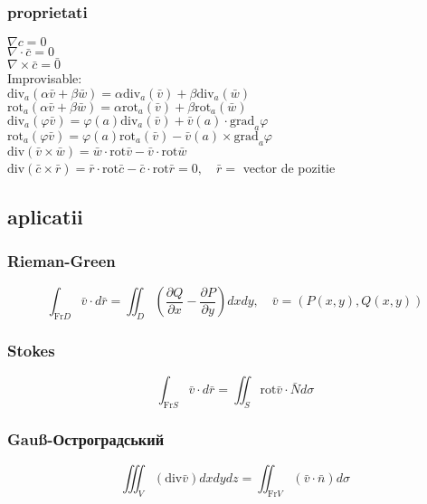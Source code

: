 \documentclass{article}
\newcommand{\parti}[2]{\frac{\partial #1}{ \partial #2}}
\newcommand*{\grad}{\mathrm{grad}}
\renewcommand*{\div}{\mathrm{div}}
\newcommand*{\rot}{\mathrm{rot}}
\newcommand*{\Fr}{\mathrm{Fr}}
\begin{document}
\subsubsection*{proprietati}
$\nabla c = 0$\\
$\nabla \cdot \bar{c} = 0$\\
$\nabla \times \bar{c} = \bar 0$\\
Improvisable:\\
$\div_a(\alpha \bar{v} + \beta \bar{w}) = \alpha \div_a(\bar v) + \beta \div_a(\bar w)$\\
$\rot_a(\alpha \bar{v} + \beta \bar{w}) = \alpha \rot_a(\bar v) + \beta \rot_a(\bar w)$\\
$\div_a(\varphi \bar v) = \varphi(a) \div_a(\bar v) + \bar v (a) \cdot \grad_a \varphi$\\
$\rot_a(\varphi \bar v) = \varphi(a) \rot_a(\bar v) - \bar v (a) \times \grad_a \varphi$\\
$\div(\bar v \times \bar w)= \bar w \cdot \rot \bar v - \bar v \cdot \rot \bar w$\\
$\div(\bar c \times \bar r)= \bar r \cdot \rot \bar c - \bar c \cdot \rot \bar r = 0, \quad \bar r = $ vector de pozitie \\
\subsection*{aplicatii}
\subsubsection*{Rieman-Green}
\[ \int_{\Fr D} \bar v \cdot d\bar{r} = \iint_D \left( \parti{Q}{x} - \parti{P}{y} \right) dx dy, \quad \bar{v} = (P(x,y), Q(x,y)) \]
\subsubsection*{Stokes}
\[ \int_{\Fr S} \bar v \cdot d \bar r = \iint_S \rot \bar v \cdot \bar N d \sigma \]
\subsubsection*{Gauß-Остроградський}
\[\iiint_V (\div \bar v) dx dy dz = \iint_{\Fr V} (\bar v \cdot \bar n) d\sigma \]
\end{document}
